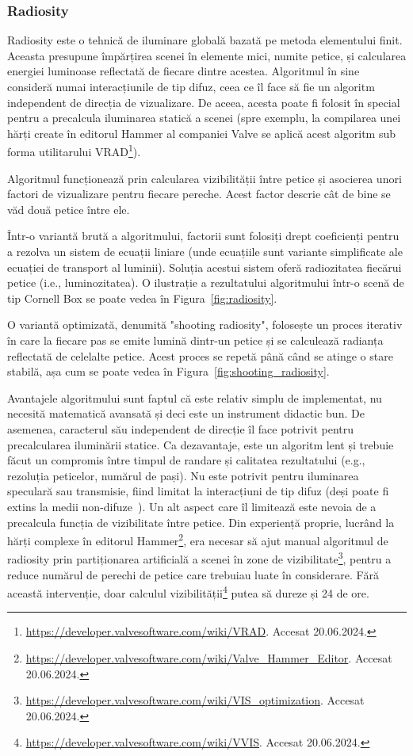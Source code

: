 \documentclass[12pt,a4paper]{report}
\numberwithin{equation}{section} %
\begin{document}
\subsubsection*{Radiosity}
Radiosity este o tehnică de iluminare globală bazată pe metoda elementului finit.
Aceasta presupune împărțirea scenei în elemente mici, numite petice, și calcularea
energiei luminoase reflectată de fiecare dintre acestea. Algoritmul în sine consideră
numai interacțiunile de tip difuz, ceea ce îl face să fie un algoritm independent
de direcția de vizualizare. De aceea, acesta poate fi folosit în special pentru a precalcula
iluminarea statică a scenei (spre exemplu, la compilarea unei hărți create în editorul
Hammer al companiei Valve se aplică acest algoritm sub forma utilitarului VRAD\footnote{\url{https://developer.valvesoftware.com/wiki/VRAD}. Accesat 20.06.2024.}).

Algoritmul funcționează prin calcularea vizibilității între petice și asocierea
unori factori de vizualizare pentru fiecare pereche. Acest factor descrie
cât de bine se văd două petice între ele.

Într-o variantă brută a algoritmului, factorii sunt folosiți drept coeficienți pentru a rezolva
un sistem de ecuații liniare (unde ecuațiile sunt variante simplificate ale ecuației
de transport al luminii). Soluția acestui sistem oferă radiozitatea fiecărui petice
(i.e., luminozitatea). O ilustrație a rezultatului algoritmului într-o scenă
de tip Cornell Box se poate vedea în Figura~\ref{fig:radiosity}.

O variantă optimizată, denumită "shooting radiosity", folosește un proces iterativ în
care la fiecare pas se emite lumină dintr-un petice și se calculează radianța
reflectată de celelalte petice. Acest proces se repetă până când se atinge o stare
stabilă, așa cum se poate vedea în Figura~\ref{fig:shooting_radiosity}.

Avantajele algoritmului sunt faptul că este relativ simplu de implementat, nu necesită
matematică avansată și deci este un instrument didactic bun. De asemenea, caracterul
său independent de direcție îl face potrivit pentru precalcularea iluminării statice.
Ca dezavantaje, este un algoritm lent și trebuie făcut un compromis între timpul de
randare și calitatea rezultatului (e.g., rezoluția peticelor, numărul de pași). Nu este
potrivit pentru iluminarea speculară sau transmisie, fiind limitat la interacțiuni de tip difuz
(deși poate fi extins la medii non-difuze~\cite{Immel}).
Un alt aspect care îl limitează este nevoia de a precalcula funcția de vizibilitate între petice.
Din experiență proprie, lucrând la hărți complexe în editorul Hammer\footnote{\url{https://developer.valvesoftware.com/wiki/Valve_Hammer_Editor}. Accesat 20.06.2024.},
era necesar să ajut manual algoritmul de radiosity prin partiționarea artificială a
scenei în zone de vizibilitate\footnote{\url{https://developer.valvesoftware.com/wiki/VIS_optimization}. Accesat 20.06.2024.}, pentru a reduce numărul de perechi de petice care
trebuiau luate în considerare. Fără această intervenție, doar calculul vizibilității\footnote{\url{https://developer.valvesoftware.com/wiki/VVIS}. Accesat 20.06.2024.}
putea să dureze și 24 de ore.
\end{document}
